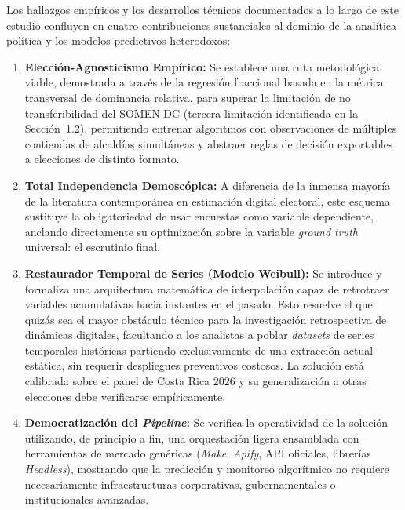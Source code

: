 Los hallazgos empíricos y los desarrollos técnicos documentados a lo largo de este estudio confluyen en cuatro contribuciones sustanciales al dominio de la analítica política y los modelos predictivos heterodoxos:

\begin{enumerate}
    \item \textbf{Elección-Agnosticismo Empírico:} Se establece una ruta metodológica viable, demostrada a través de la regresión fraccional basada en la métrica transversal de dominancia relativa, para superar la limitación de no transferibilidad del SOMEN-DC (tercera limitación identificada en la Sección~1.2), permitiendo entrenar algoritmos con observaciones de múltiples contiendas de alcaldías simultáneas y abstraer reglas de decisión exportables a elecciones de distinto formato.
    
    \item \textbf{Total Independencia Demoscópica:} A diferencia de la inmensa mayoría de la literatura contemporánea en estimación digital electoral, este esquema sustituye la obligatoriedad de usar encuestas como variable dependiente, anclando directamente su optimización sobre la variable \textit{ground truth} universal: el escrutinio final. 
    
    \item \textbf{Restaurador Temporal de Series (Modelo Weibull):} Se introduce y formaliza una arquitectura matemática de interpolación capaz de retrotraer variables acumulativas hacia instantes en el pasado. Esto resuelve el que quizás sea el mayor obstáculo técnico para la investigación retrospectiva de dinámicas digitales, facultando a los analistas a poblar \textit{datasets} de series temporales históricas partiendo exclusivamente de una extracción actual estática, sin requerir despliegues preventivos costosos. La solución está calibrada sobre el panel de Costa Rica 2026 y su generalización a otras elecciones debe verificarse empíricamente.
    
    \item \textbf{Democratización del \textit{Pipeline}:} Se verifica la operatividad de la solución utilizando, de principio a fin, una orquestación ligera ensamblada con herramientas de mercado genéricas (\textit{Make}, \textit{Apify}, API oficiales, librerías \textit{Headless}), mostrando que la predicción y monitoreo algorítmico no requiere necesariamente infraestructuras corporativas, gubernamentales o institucionales avanzadas.
\end{enumerate}

